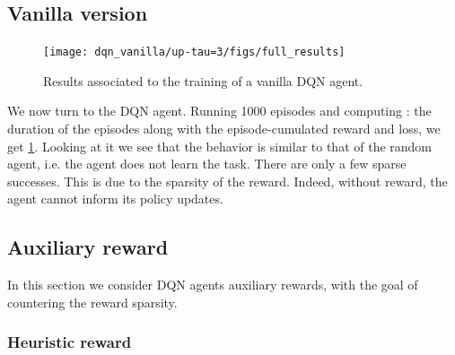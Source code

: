 \documentclass[a4paper, 12pt,oneside]{article}
\begin{document}
        \subsection{Vanilla version}
        \begin{figure}[h!]
            \centering
            \vspace{0em}
                \texttt{[image: dqn\_vanilla/up-tau=3/figs/full\_results]}
                \caption{Results associated to the training of a vanilla DQN agent.}
                \label{fig:dqn-vanilla-neps=1000}
        \end{figure}
        We now turn to the DQN agent. 
        Running 1000 episodes and computing : the duration of the episodes along with the episode-cumulated reward and loss, we get \ref{fig:dqn-vanilla-neps=1000}. Looking at it we see that the behavior is similar to that of the random agent, i.e. the agent does not learn the task. There are only a few sparse successes. This is due to the sparsity of the reward. Indeed, without reward, the agent cannot inform its policy updates. 
        \subsection{Auxiliary reward}
        In this section we consider DQN agents auxiliary rewards, with the goal of countering the reward sparsity. 
        \subsubsection{Heuristic reward}
\end{document}
